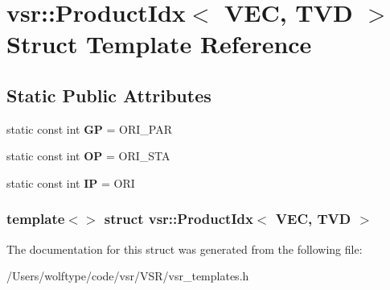 \hypertarget{structvsr_1_1_product_idx_3_01_v_e_c_00_01_t_v_d_01_4}{\section{vsr\-:\-:Product\-Idx$<$ V\-E\-C, T\-V\-D $>$ Struct Template Reference}
\label{structvsr_1_1_product_idx_3_01_v_e_c_00_01_t_v_d_01_4}
}
\subsection*{Static Public Attributes}
\begin{DoxyCompactItemize}
\item 
\hypertarget{structvsr_1_1_product_idx_3_01_v_e_c_00_01_t_v_d_01_4_a97e643a86db0474372ecd489945caee3}{static const int {\bfseries G\-P} = O\-R\-I\-\_\-\-P\-A\-R}\label{structvsr_1_1_product_idx_3_01_v_e_c_00_01_t_v_d_01_4_a97e643a86db0474372ecd489945caee3}

\item 
\hypertarget{structvsr_1_1_product_idx_3_01_v_e_c_00_01_t_v_d_01_4_ab86696721288cf20afcd0d91d9f47c2e}{static const int {\bfseries O\-P} = O\-R\-I\-\_\-\-S\-T\-A}\label{structvsr_1_1_product_idx_3_01_v_e_c_00_01_t_v_d_01_4_ab86696721288cf20afcd0d91d9f47c2e}

\item 
\hypertarget{structvsr_1_1_product_idx_3_01_v_e_c_00_01_t_v_d_01_4_a8cd19cd015945f06bd77e688a23e482a}{static const int {\bfseries I\-P} = O\-R\-I}\label{structvsr_1_1_product_idx_3_01_v_e_c_00_01_t_v_d_01_4_a8cd19cd015945f06bd77e688a23e482a}

\end{DoxyCompactItemize}
\subsubsection*{template$<$$>$ struct vsr\-::\-Product\-Idx$<$ V\-E\-C, T\-V\-D $>$}



The documentation for this struct was generated from the following file\-:\begin{DoxyCompactItemize}
\item 
/\-Users/wolftype/code/vsr/\-V\-S\-R/vsr\-\_\-templates.\-h\end{DoxyCompactItemize}
